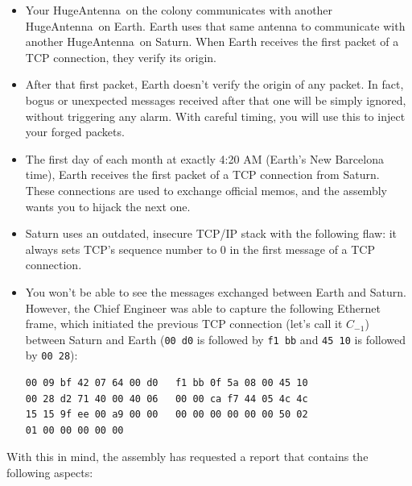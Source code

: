 \begin{itemize}[itemsep=0.1cm]
\item Your HugeAntenna\texttrademark\ on the colony communicates with another HugeAntenna\texttrademark\ on Earth. Earth uses that same antenna to communicate with another HugeAntenna\texttrademark\ on Saturn.
When Earth receives the first packet of a TCP connection, they verify its origin.

\item After that first packet, Earth doesn't verify the origin of any packet. In fact, bogus or unexpected messages received after that one will be simply ignored, without triggering any alarm. With careful timing, you will use this to inject your forged packets.

\item The first day of each month at exactly 4:20 AM (Earth's New Barcelona time), Earth receives the first packet of a TCP connection from Saturn. These connections are used to exchange official memos, and the assembly wants you to hijack the next one.

\item Saturn uses an outdated, insecure TCP/IP stack with the following flaw: it always sets TCP's sequence number to $0$ in the first message of a TCP connection.

\item You won't be able to see the messages exchanged between Earth and Saturn. However, the Chief Engineer was able to capture the following Ethernet frame, which initiated the previous TCP connection (let's call it $C_{-1}$) between Saturn and Earth (\texttt{00 d0} is followed by \texttt{f1 bb} and \texttt{45 10} is followed by \texttt{00 28}):

\vspace{0.25cm}
\begin{center}
\begin{minipage}{0.5\linewidth}
\begin{verbatim}
00 09 bf 42 07 64 00 d0   f1 bb 0f 5a 08 00 45 10
00 28 d2 71 40 00 40 06   00 00 ca f7 44 05 4c 4c
15 15 9f ee 00 a9 00 00   00 00 00 00 00 00 50 02
01 00 00 00 00 00
\end{verbatim}
\end{minipage}
\end{center}
\vspace{0.25cm}
\end{itemize}

\noindent
With this in mind, the assembly has requested a report that contains the following aspects:

